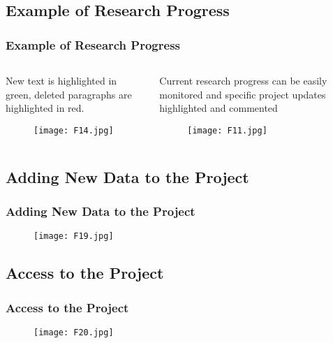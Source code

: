 \documentclass[pdflatex,compress,8pt,
	xcolor={dvipsnames,dvipsnames,svgnames,x11names,table},
	hyperref={
	breaklinks = true, 
	pdfauthor={Lemenkova Polina}, 
	pdfsubject={Preentation}, 
	pdfcreator={Lemenkova Polina}, 
	pdfproducer={Lemenkova Polina}, 
	colorlinks=true,linkcolor=blue, 
	citecolor=NavyBlue, 
	urlcolor = NavyBlue, 
	breaklinks = true}]{beamer}
\begin{document}
\subsection{Example of Research Progress}
\begin{frame}\frametitle{Example of Research Progress}
\begin{minipage}[0.4\textheight]{\textwidth}
\begin{columns}[T]
\begin{column}{0.5\textwidth}
\vspace{1em}
New text is highlighted in green, deleted paragraphs are highlighted in red.
\begin{figure}[H]
	\centering
		\texttt{[image: F14.jpg]}
\end{figure}
\end{column}
\begin{column}{0.5\textwidth}
\vspace{1em} 
Current research progress can be easily monitored and specific project updates highlighted and commented
\begin{figure}[H]
	\centering
		\texttt{[image: F11.jpg]}
\end{figure}
\end{column}
\end{columns}
\end{minipage}
\end{frame}


\subsection{Adding New Data to the Project}
\begin{frame}\frametitle{Adding New Data to the Project}
\begin{figure}[H]
	\centering
		\texttt{[image: F19.jpg]}
\end{figure}
\end{frame}

\subsection{Access to the Project}
\begin{frame}\frametitle{Access to the Project}
\begin{figure}[H]
	\centering
		\texttt{[image: F20.jpg]}
\end{figure}
\end{frame}
\end{document}
